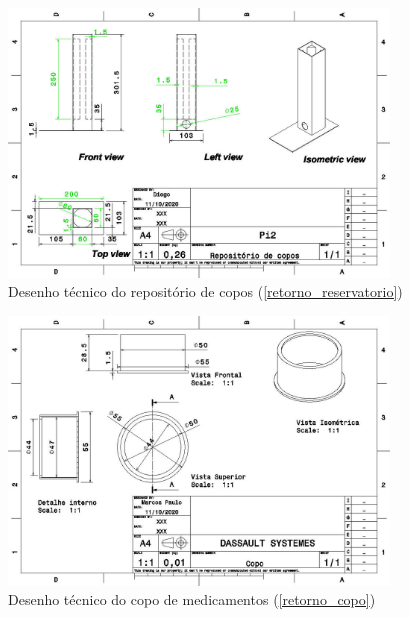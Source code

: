 \begin{apendicesenv}
\begin{figure}[H]
    \centering
    \includegraphics[width=0.9\textwidth]{figuras/estrutura/Desenhos/Drawing1_RepositoriodeCopos.jpg}
    \caption{Desenho técnico do repositório de copos (\ref{retorno_reservatorio})}
    \label{fig:repositorio}
\end{figure}

\begin{figure}[H]
    \centering
    \includegraphics[width=0.9\textwidth]{figuras/estrutura/Desenhos/Copo.jpg}
    \caption{Desenho técnico do copo de medicamentos (\ref{retorno_copo})}
    \label{fig:copo}
\end{figure}


\end{apendicesenv}
